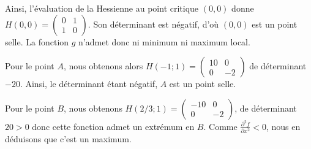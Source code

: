{{\begin{enumerate}
{Ainsi, l'évaluation de la Hessienne au point critique $(0,0)$ donne $H(0,0)=\begin{pmatrix} 0  & 1\\ 1&0\end{pmatrix}$. Son déterminant est négatif, d'où $(0,0)$ est un point selle. 
La fonction $g$ n'admet donc ni minimum ni maximum local. 

Pour le point $A$, nous obtenons alors $H(-1;1)= \begin{pmatrix} 10 & 0 \\ 0 & -2\end{pmatrix}$ de déterminant 
$-20$. Ainsi, le déterminant étant négatif, $A$ est un point selle. 

Pour le point $B$, nous obtenons 
$H(2/3;1) = \begin{pmatrix} -10 & 0 \\ 0 & -2\end{pmatrix}$, de déterminant $20>0$ donc cette fonction admet un extrémum en $B$.  Comme $\frac{\partial^2 f}{\partial x^2}<0$, nous en déduisons que c'est un maximum. 



}
\end{enumerate} } 
} 